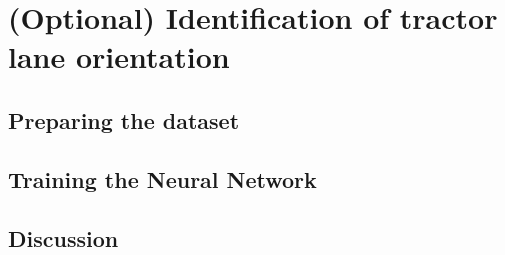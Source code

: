\section{(Optional) Identification of tractor lane orientation}

\subsection{Preparing the dataset}

\subsection{Training the Neural Network}

\subsection{Discussion}

\newpage
